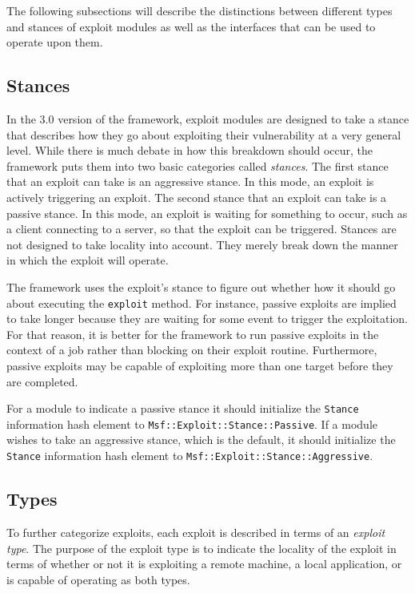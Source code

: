 \documentclass{report}
\begin{document}
\par
The following subsections will describe the distinctions between
different types and stances of exploit modules as well as the
interfaces that can be used to operate upon them.

        \subsection{Stances}

\par
In the 3.0 version of the framework, exploit modules are designed to
take a stance that describes how they go about exploiting their
vulnerability at a very general level.  While there is much debate
in how this breakdown should occur, the framework puts them into two
basic categories called \textit{stances}.  The first stance that an
exploit can take is an aggressive stance.  In this mode, an exploit
is actively triggering an exploit.  The second stance that an
exploit can take is a passive stance.  In this mode, an exploit is
waiting for something to occur, such as a client connecting to a
server, so that the exploit can be triggered.  Stances are not
designed to take locality into account.  They merely break down the
manner in which the exploit will operate.

\par
The framework uses the exploit's stance to figure out whether how it
should go about executing the \texttt{exploit} method.  For
instance, passive exploits are implied to take longer because they
are waiting for some event to trigger the exploitation.  For that
reason, it is better for the framework to run passive exploits in
the context of a job rather than blocking on their exploit routine.
Furthermore, passive exploits may be capable of exploiting more than
one target before they are completed.

\par
For a module to indicate a passive stance it should initialize the
\texttt{Stance} information hash element to
\texttt{Msf::Exploit::Stance::Passive}.  If a module wishes to take
an aggressive stance, which is the default, it should initialize the
\texttt{Stance} information hash element to
\texttt{Msf::Exploit::Stance::Aggressive}.

        \subsection{Types}

\par
To further categorize exploits, each exploit is described in terms
of an \textit{exploit type}.  The purpose of the exploit type is to
indicate the locality of the exploit in terms of whether or not it
is exploiting a remote machine, a local application, or is capable
of operating as both types.
\end{document}
